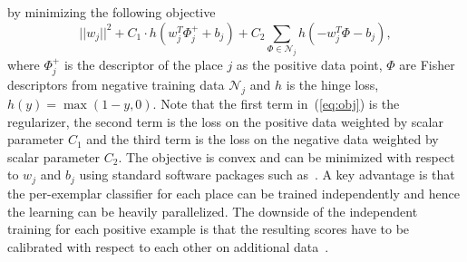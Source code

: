\documentclass[table]{article} %
\begin{document}
	by minimizing the following objective  
        \begin{equation}
	        ||w_j||^{2} +C_1 \cdot h
	        				\left(
	        				w_j^T\Phi^+_j+b_j
	        				\right)
	                         +C_2\sum_{\Phi\in \mathcal N_j}h
	                         \left(
	                         -w_j^T\Phi-b_j
	                         \right), 	
	       	\label{eq:obj} 
	  	\end{equation}
	  	where $\Phi^+_j$ is the descriptor of the place $j$ as the positive data point, $\Phi$ are Fisher descriptors from negative training data $\mathcal N_j$ and $h$ is the hinge loss, $h(y) = \max(1-y,0)$. Note that the first term in~(\ref{eq:obj}) is the regularizer, the second term is the loss on the positive data weighted by scalar parameter $C_1$ and the third term is the loss on the negative data weighted by scalar parameter $C_2$. The objective is convex and can be minimized with respect to $w_j$ and $b_j$ using standard software packages such as~\cite{libsvm}. A key advantage is that the per-exemplar classifier for each place can be trained independently and hence the learning can be heavily parallelized. The downside of the independent training for each positive example is that the resulting scores have to be calibrated with respect to each other on additional data~\cite{Gronat13,Malisiewicz11}.
\end{document}

